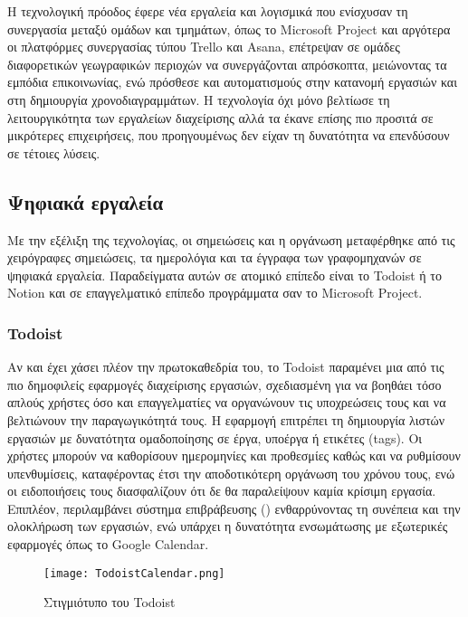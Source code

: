         Η τεχνολογική πρόοδος έφερε νέα εργαλεία και λογισμικά που ενίσχυσαν τη συνεργασία μεταξύ ομάδων και τμημάτων, όπως το Microsoft Project και αργότερα οι πλατφόρμες συνεργασίας τύπου Trello και Asana, επέτρεψαν σε ομάδες διαφορετικών γεωγραφικών περιοχών να συνεργάζονται απρόσκοπτα, μειώνοντας τα εμπόδια επικοινωνίας, ενώ πρόσθεσε και αυτοματισμούς στην κατανομή εργασιών και στη δημιουργία χρονοδιαγραμμάτων. Η τεχνολογία όχι μόνο βελτίωσε τη λειτουργικότητα των εργαλείων διαχείρισης αλλά τα έκανε επίσης πιο προσιτά σε μικρότερες επιχειρήσεις, που προηγουμένως δεν είχαν τη δυνατότητα να επενδύσουν σε τέτοιες λύσεις.

        \subsection{Ψηφιακά εργαλεία} \label{sec:digitaltools}
            Με την εξέλιξη της τεχνολογίας, οι σημειώσεις και η οργάνωση μεταφέρθηκε από τις χειρόγραφες σημειώσεις, τα ημερολόγια και τα έγγραφα των γραφομηχανών σε  ψηφιακά εργαλεία. Παραδείγματα αυτών σε ατομικό επίπεδο είναι το Todoist ή το Notion και σε επαγγελματικό επίπεδο προγράμματα σαν το Microsoft Project.

            \subsubsection{Todoist}
                Αν και έχει χάσει πλέον την πρωτοκαθεδρία του, το Todoist \cite{Todoist} παραμένει μια από τις πιο δημοφιλείς εφαρμογές διαχείρισης εργασιών, σχεδιασμένη για να βοηθάει τόσο απλούς χρήστες όσο και επαγγελματίες να οργανώνουν τις υποχρεώσεις τους και να βελτιώνουν την παραγωγικότητά τους. Η εφαρμογή επιτρέπει τη δημιουργία λιστών εργασιών με δυνατότητα ομαδοποίησης σε έργα, υποέργα ή ετικέτες (tags). Οι χρήστες μπορούν να καθορίσουν ημερομηνίες και προθεσμίες καθώς και να ρυθμίσουν υπενθυμίσεις, καταφέροντας έτσι την αποδοτικότερη οργάνωση του χρόνου τους, ενώ οι ειδοποιήσεις τους διασφαλίζουν ότι δε θα παραλείψουν καμία κρίσιμη εργασία. Επιπλέον, περιλαμβάνει σύστημα επιβράβευσης () ενθαρρύνοντας τη συνέπεια και την ολοκλήρωση των εργασιών, ενώ υπάρχει η δυνατότητα ενσωμάτωσης με εξωτερικές εφαρμογές όπως το Google Calendar.

                \begin{figure}[h!] \noindent \centering
                    \texttt{[image: TodoistCalendar.png]}
                    \caption{\centering Στιγμιότυπο του Todoist}
                \end{figure}

